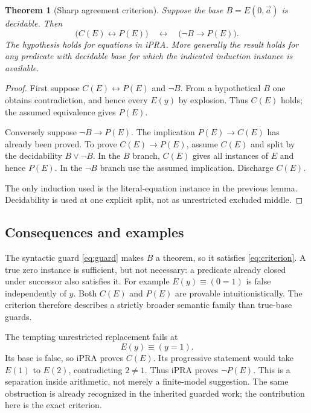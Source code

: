 \documentclass[11pt,letterpaper]{article}
\newtheorem{theorem}{Theorem}[section]
\theoremstyle{definition}
\theoremstyle{remark}
\begin{document}
\begin{theorem}[Sharp agreement criterion]
Suppose the base $B=E(0,\vec a)$ is decidable. Then
\begin{equation}
 \bigl(C(E)\leftrightarrow P(E)\bigr)
 \quad\leftrightarrow\quad
 \bigl(\neg B\to P(E)\bigr).
 \label{eq:criterion}
\end{equation}
The hypothesis holds for equations in iPRA. More generally the result
holds for any predicate with decidable base for which the indicated
induction instance is available.
\end{theorem}
\begin{proof}
First suppose $C(E)\leftrightarrow P(E)$ and $\neg B$. From a hypothetical
$B$ one obtains contradiction, and hence every $E(y)$ by explosion.
Thus $C(E)$ holds; the assumed equivalence gives $P(E)$.

Conversely suppose $\neg B\to P(E)$. The implication $P(E)\to C(E)$
has already been proved. To prove $C(E)\to P(E)$, assume $C(E)$ and
split by the decidability $B\vee\neg B$. In the $B$ branch, $C(E)$ gives
all instances of $E$ and hence $P(E)$. In the $\neg B$ branch use the
assumed implication. Discharge $C(E)$.

The only induction used is the literal-equation instance in the previous
lemma. Decidability is used at one explicit split, not as unrestricted
excluded middle.
\end{proof}

\subsection{Consequences and examples}

The syntactic guard \eqref{eq:guard} makes $B$ a theorem, so it satisfies
\eqref{eq:criterion}. A true zero instance is sufficient, but not
necessary: a predicate already closed under successor also satisfies it.
For example $E(y)\equiv(0=1)$ is false independently of $y$. Both $C(E)$
and $P(E)$ are provable intuitionistically. The criterion therefore
describes a strictly broader semantic family than true-base guards.

The tempting unrestricted replacement fails at
\[
                         E(y)\equiv(y=1).
\]
Its base is false, so iPRA proves $C(E)$. Its progressive statement would
take $E(1)$ to $E(2)$, contradicting $2\ne1$. Thus iPRA proves
$\neg P(E)$. This is a separation inside arithmetic, not merely a
finite-model suggestion. The same obstruction is already recognized in
the inherited guarded work; the contribution here is the exact criterion.
\end{document}
